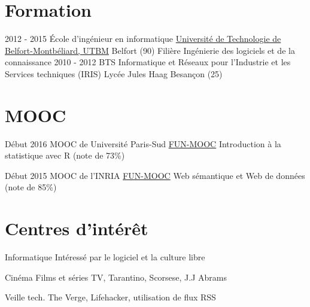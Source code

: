 \documentclass[letterpaper]{twentysecondcv} %
\begin{document}
\section{Formation}

\begin{twenty} %
	\twentyitem
    	{2012 - 2015}
        {École d'ingénieur en informatique}
        {\href{http://www.utbm.fr/}{Université de Technologie de Belfort-Montbéliard, UTBM}}
        {Belfort (90)}
        {Filière Ingénierie des logiciels et de la connaissance}
	\twentyitem
    	{2010 - 2012}
        {BTS Informatique et Réseaux pour l'Industrie et les Services techniques (IRIS)}
        {Lycée Jules Haag}{}
        {Besançon (25)}
\end{twenty}

\section{MOOC}

\begin{twenty}
    
    \twentyitem
    	{Début 2016}
        {MOOC de Université Paris-Sud}
        {\href{http://www.fun-mooc.fr/courses/UPSUD/42001S06/session06/about}{FUN-MOOC}}
        {}
        {
        {Introduction à la statistique avec R (note de 73\%)}
        }
        
    \twentyitem
    	{Début 2015}
        {MOOC de l’INRIA}
        {\href{https://www.fun-mooc.fr}{FUN-MOOC}}
        {}
        {
        {Web sémantique et Web de données (note de 85\%)}
        }

\end{twenty}

\section{Centres d'intérêt}

\begin{twenty}    
    \twentyitem
    	{Informatique}
    	{}
    	{}
        {Intéressé par le logiciel et la culture libre}
        {}
	
	  \twentyitem
    	{Cinéma}
    	{}
    	{}
        {Films et séries TV, Tarantino, Scorsese, J.J Abrams}
        {}
        
     \twentyitem
    	{Veille tech.}
    	{}
    	{}
        {The Verge, Lifehacker, utilisation de flux RSS}
        {}


        
       
        

\end{twenty}
\end{document}
